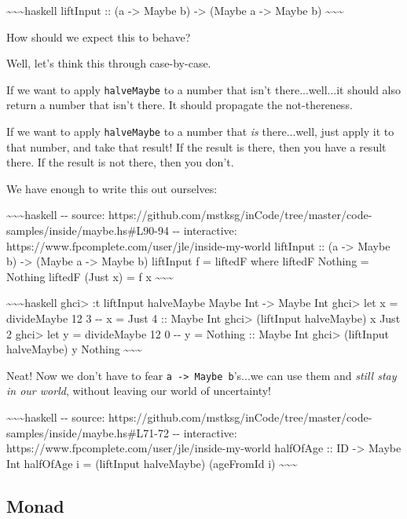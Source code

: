 \documentclass[]{article}
\begin{document}
\textasciitilde{}\textasciitilde{}\textasciitilde{}haskell liftInput :: (a
-\textgreater{} Maybe b) -\textgreater{} (Maybe a -\textgreater{} Maybe b)
\textasciitilde{}\textasciitilde{}\textasciitilde{}

How should we expect this to behave?

Well, let's think this through case-by-case.

If we want to apply \texttt{halveMaybe} to a number that isn't there...well...it
should also return a number that isn't there. It should propagate the
not-thereness.

If we want to apply \texttt{halveMaybe} to a number that \emph{is} there...well,
just apply it to that number, and take that result! If the result is there, then
you have a result there. If the result is not there, then you don't.

We have enough to write this out ourselves:

\textasciitilde{}\textasciitilde{}\textasciitilde{}haskell -\/- source:
https://github.com/mstksg/inCode/tree/master/code-samples/inside/maybe.hs\#L90-94
-\/- interactive: https://www.fpcomplete.com/user/jle/inside-my-world liftInput
:: (a -\textgreater{} Maybe b) -\textgreater{} (Maybe a -\textgreater{} Maybe b)
liftInput f = liftedF where liftedF Nothing = Nothing liftedF (Just x) = f x
\textasciitilde{}\textasciitilde{}\textasciitilde{}

\textasciitilde{}\textasciitilde{}\textasciitilde{}haskell ghci\textgreater{} :t
liftInput halveMaybe Maybe Int -\textgreater{} Maybe Int ghci\textgreater{} let
x = divideMaybe 12 3 -\/- x = Just 4 :: Maybe Int ghci\textgreater{} (liftInput
halveMaybe) x Just 2 ghci\textgreater{} let y = divideMaybe 12 0 -\/- y =
Nothing :: Maybe Int ghci\textgreater{} (liftInput halveMaybe) y Nothing
\textasciitilde{}\textasciitilde{}\textasciitilde{}

Neat! Now we don't have to fear \texttt{a\ -\textgreater{}\ Maybe\ b}'s...we can
use them and \emph{still stay in our world}, without leaving our world of
uncertainty!

\textasciitilde{}\textasciitilde{}\textasciitilde{}haskell -\/- source:
https://github.com/mstksg/inCode/tree/master/code-samples/inside/maybe.hs\#L71-72
-\/- interactive: https://www.fpcomplete.com/user/jle/inside-my-world halfOfAge
:: ID -\textgreater{} Maybe Int halfOfAge i = (liftInput halveMaybe) (ageFromId
i) \textasciitilde{}\textasciitilde{}\textasciitilde{}

\subsection{Monad}
\end{document}
